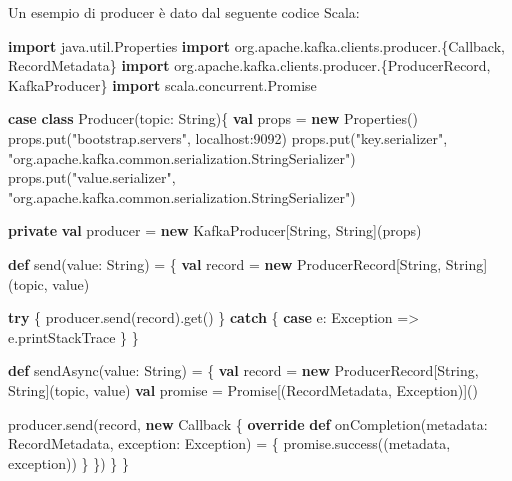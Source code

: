 \documentclass[]{article}
\newenvironment{Shaded}{}{}
\newcommand{\KeywordTok}[1]{\textcolor[rgb]{0.00,0.44,0.13}{\textbf{#1}}}
\newcommand{\DecValTok}[1]{\textcolor[rgb]{0.25,0.63,0.44}{#1}}
\newcommand{\StringTok}[1]{\textcolor[rgb]{0.25,0.44,0.63}{#1}}
\newcommand{\FunctionTok}[1]{\textcolor[rgb]{0.02,0.16,0.49}{#1}}
\newcommand{\NormalTok}[1]{#1}
\begin{document}
Un esempio di producer è dato dal seguente codice Scala:

\small  

\begin{Shaded}
\begin{Highlighting}[]
\KeywordTok{import}\NormalTok{ java.}\FunctionTok{util}\NormalTok{.}\FunctionTok{Properties}
\KeywordTok{import}\NormalTok{ org.}\FunctionTok{apache}\NormalTok{.}\FunctionTok{kafka}\NormalTok{.}\FunctionTok{clients}\NormalTok{.}\FunctionTok{producer}\NormalTok{.\{Callback, RecordMetadata\}}
\KeywordTok{import}\NormalTok{ org.}\FunctionTok{apache}\NormalTok{.}\FunctionTok{kafka}\NormalTok{.}\FunctionTok{clients}\NormalTok{.}\FunctionTok{producer}\NormalTok{.\{ProducerRecord, KafkaProducer\}}
\KeywordTok{import}\NormalTok{ scala.}\FunctionTok{concurrent}\NormalTok{.}\FunctionTok{Promise}

\KeywordTok{case} \KeywordTok{class} \FunctionTok{Producer}\NormalTok{(topic: String)\{}
    \KeywordTok{val}\NormalTok{ props = }\KeywordTok{new}\NormalTok{ Properties()}
\NormalTok{    props.}\FunctionTok{put}\NormalTok{(}\StringTok{"bootstrap.servers"}\NormalTok{, localhost:}\DecValTok{9092}\NormalTok{)}
\NormalTok{    props.}\FunctionTok{put}\NormalTok{(}\StringTok{"key.serializer"}\NormalTok{, }
        \StringTok{"org.apache.kafka.common.serialization.StringSerializer"}\NormalTok{)}
\NormalTok{    props.}\FunctionTok{put}\NormalTok{(}\StringTok{"value.serializer"}\NormalTok{, }
        \StringTok{"org.apache.kafka.common.serialization.StringSerializer"}\NormalTok{)}
    
    \KeywordTok{private} \KeywordTok{val}\NormalTok{ producer = }\KeywordTok{new}\NormalTok{ KafkaProducer[String, String](props)    }
    
    \KeywordTok{def} \FunctionTok{send}\NormalTok{(value: String) = \{}
      \KeywordTok{val}\NormalTok{ record = }\KeywordTok{new}\NormalTok{ ProducerRecord[String, String](topic, value)}

      \KeywordTok{try}\NormalTok{ \{}
\NormalTok{        producer.}\FunctionTok{send}\NormalTok{(record).}\FunctionTok{get}\NormalTok{()}
\NormalTok{      \} }\KeywordTok{catch}\NormalTok{ \{}
        \KeywordTok{case}\NormalTok{ e: Exception => e.}\FunctionTok{printStackTrace}
\NormalTok{      \}}
\NormalTok{    \}   }

    \KeywordTok{def} \FunctionTok{sendAsync}\NormalTok{(value: String) = \{}
        \KeywordTok{val}\NormalTok{ record = }\KeywordTok{new}\NormalTok{ ProducerRecord[String, String](topic, value)}
        \KeywordTok{val}\NormalTok{ promise = Promise[(RecordMetadata, Exception)]()}

\NormalTok{        producer.}\FunctionTok{send}\NormalTok{(record, }\KeywordTok{new}\NormalTok{ Callback \{}
            \KeywordTok{override} \KeywordTok{def} \FunctionTok{onCompletion}\NormalTok{(metadata: RecordMetadata, }
\NormalTok{                                      exception: Exception) = \{}
\NormalTok{                promise.}\FunctionTok{success}\NormalTok{((metadata, exception))}
\NormalTok{            \}}
\NormalTok{        \})}
\NormalTok{    \}}
\NormalTok{\}}
\end{Highlighting}
\end{Shaded}
\end{document}
